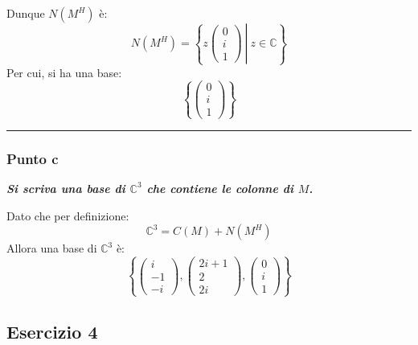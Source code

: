 \documentclass[a4paper]{article}
\newcommand{\longline}{\noindent\rule{\textwidth}{0.4pt}}
\begin{document}
	Dunque $N\left(M^{H}\right)$ è:
	\begin{equation*}
		N\left(M^{H}\right) = \left\{
			\left.
				z
				\begin{pmatrix}
					0 \\
					i \\
					1
				\end{pmatrix} \:
			\right| \: z \in \mathbb{C}
		\right\}
	\end{equation*}
	Per cui, si ha una base:
	\begin{equation*}
		\left\{
			\begin{pmatrix}
				0 \\
				i \\
				1
			\end{pmatrix}
		\right\}
	\end{equation*}

	\longline

	\subsubsection{Punto c}

	\textcolor{Green4}{\textbf{\emph{Si scriva una base di $\mathbb{C}^{3}$ che contiene le colonne di $M$.}}}\newline

	\noindent
	Dato che per definizione:
	\begin{equation*}
		\mathbb{C}^{3} = C\left(M\right) + N\left(M^{H}\right)
	\end{equation*}
	Allora una base di $\mathbb{C}^{3}$ è:
	\begin{equation*}
		\left\{
			\begin{pmatrix}
				i  \\
				-1 \\
				-i
			\end{pmatrix},
			\begin{pmatrix}
				2i+1 \\
				2 	 \\
				2i
			\end{pmatrix},
			\begin{pmatrix}
				0 \\
				i \\
				1
			\end{pmatrix}
		\right\}
	\end{equation*}\newpage

	\subsection{Esercizio 4}
\end{document}

